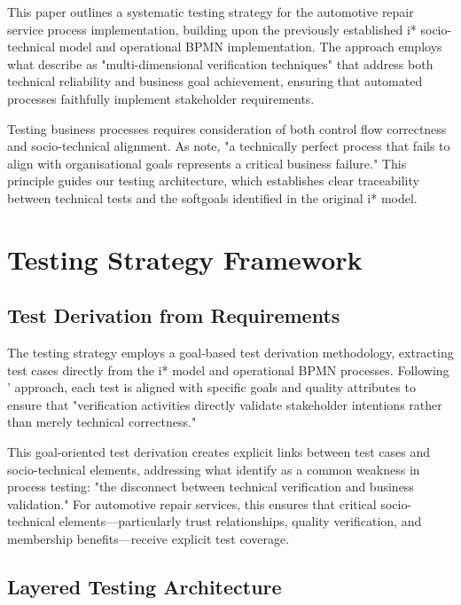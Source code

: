 \documentclass[14pt,a4paper]{article}
\begin{document}
This paper outlines a systematic testing strategy for the automotive repair service process implementation, building upon the previously established i* socio-technical model and operational BPMN implementation. The approach employs what \textit{\parencite[p. 219]{Giray2016}} describe as "multi-dimensional verification techniques" that address both technical reliability and business goal achievement, ensuring that automated processes faithfully implement stakeholder requirements.

Testing business processes requires consideration of both control flow correctness and socio-technical alignment. As \textit{\parencite[p. 85]{Weber2016}} note, "a technically perfect process that fails to align with organisational goals represents a critical business failure." This principle guides our testing architecture, which establishes clear traceability between technical tests and the softgoals identified in the original i* model.

\section{Testing Strategy Framework}

\subsection{Test Derivation from Requirements}

The testing strategy employs a goal-based test derivation methodology, extracting test cases directly from the i* model and operational BPMN processes. Following \textit{\parencite[p. 176]{Kunze2015}}' approach, each test is aligned with specific goals and quality attributes to ensure that "verification activities directly validate stakeholder intentions rather than merely technical correctness."

This goal-oriented test derivation creates explicit links between test cases and socio-technical elements, addressing what \textit{\parencite[p. 352]{Grossmann2008}} identify as a common weakness in process testing: "the disconnect between technical verification and business validation." For automotive repair services, this ensures that critical socio-technical elements—particularly trust relationships, quality verification, and membership benefits—receive explicit test coverage.

\subsection{Layered Testing Architecture}
\end{document}
